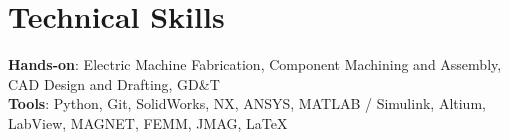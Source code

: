 \documentclass[letterpaper,11pt]{article}
\begin{document}
\section{Technical Skills}
 \begin{itemize}[leftmargin=0.15in, label={}]
    \small{\item{
     \textbf{Hands-on}{: Electric Machine Fabrication, Component Machining and Assembly, CAD Design and Drafting, GD\&T} \\
     \textbf{Tools}{: Python, Git, SolidWorks, NX, ANSYS, MATLAB / Simulink, Altium,  LabView, MAGNET, FEMM, JMAG, \LaTeX } \\
    }}
 \end{itemize}
 \vspace{-16pt}
\end{document}
